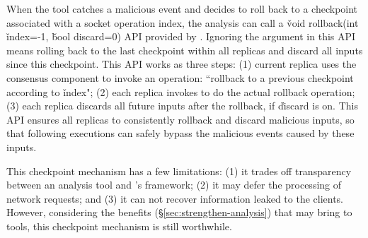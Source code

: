 When the tool catches a malicious event and decides to roll back to a 
checkpoint associated with a socket operation index, the analysis can call a 
\v{void rollback(int} \v{index=-1,} \v{bool discard=0)} API provided 
by \xxx. Ignoring the argument in this API means rolling back to the last 
checkpoint within all replicas and discard all inputs since this checkpoint. 
This API works as three steps: (1) current replica uses the \paxos consensus 
component to invoke an operation: ``rollback to a previous checkpoint according 
to \v{index}"; (2) each replica invokes \criu to do the actual rollback 
operation; (3) each replica discards all future inputs after the rollback, if 
\v{discard} is on. This API ensures all replicas to consistently rollback and 
discard malicious inputs, so that following executions can safely bypass the 
malicious events caused by these inputs.


This checkpoint mechanism has a few limitations: (1) it 
trades off transparency between an analysis tool and \xxx's framework; (2) it 
may defer the processing of network requests; and (3) it can not recover 
information leaked to the clients. However, considering the benefits 
(\S\ref{sec:strengthen-analysis}) that \xxx may bring to tools, this checkpoint 
mechanism is still worthwhile.





